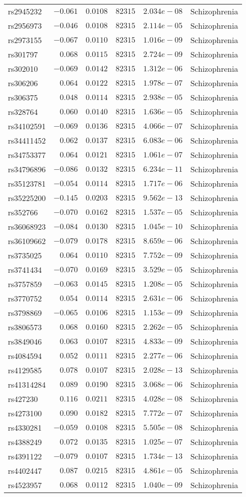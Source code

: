 \begin{tabular}{lrrrrl}
rs2945232&$-0.061$&$0.0108$&$ 82315$&$2.034e-08$&Schizophrenia\tabularnewline
rs2956973&$-0.046$&$0.0108$&$ 82315$&$2.114e-05$&Schizophrenia\tabularnewline
rs2973155&$-0.067$&$0.0110$&$ 82315$&$1.016e-09$&Schizophrenia\tabularnewline
rs301797&$ 0.068$&$0.0115$&$ 82315$&$2.724e-09$&Schizophrenia\tabularnewline
rs302010&$-0.069$&$0.0142$&$ 82315$&$1.312e-06$&Schizophrenia\tabularnewline
rs306206&$ 0.064$&$0.0122$&$ 82315$&$1.978e-07$&Schizophrenia\tabularnewline
rs306375&$ 0.048$&$0.0114$&$ 82315$&$2.938e-05$&Schizophrenia\tabularnewline
rs328764&$ 0.060$&$0.0140$&$ 82315$&$1.636e-05$&Schizophrenia\tabularnewline
rs34102591&$-0.069$&$0.0136$&$ 82315$&$4.066e-07$&Schizophrenia\tabularnewline
rs34411452&$ 0.062$&$0.0137$&$ 82315$&$6.083e-06$&Schizophrenia\tabularnewline
rs34753377&$ 0.064$&$0.0121$&$ 82315$&$1.061e-07$&Schizophrenia\tabularnewline
rs34796896&$-0.086$&$0.0132$&$ 82315$&$6.234e-11$&Schizophrenia\tabularnewline
rs35123781&$-0.054$&$0.0114$&$ 82315$&$1.717e-06$&Schizophrenia\tabularnewline
rs35225200&$-0.145$&$0.0203$&$ 82315$&$9.562e-13$&Schizophrenia\tabularnewline
rs352766&$-0.070$&$0.0162$&$ 82315$&$1.537e-05$&Schizophrenia\tabularnewline
rs36068923&$-0.084$&$0.0130$&$ 82315$&$1.045e-10$&Schizophrenia\tabularnewline
rs36109662&$-0.079$&$0.0178$&$ 82315$&$8.659e-06$&Schizophrenia\tabularnewline
rs3735025&$ 0.064$&$0.0110$&$ 82315$&$7.752e-09$&Schizophrenia\tabularnewline
rs3741434&$-0.070$&$0.0169$&$ 82315$&$3.529e-05$&Schizophrenia\tabularnewline
rs3757859&$-0.063$&$0.0145$&$ 82315$&$1.208e-05$&Schizophrenia\tabularnewline
rs3770752&$ 0.054$&$0.0114$&$ 82315$&$2.631e-06$&Schizophrenia\tabularnewline
rs3798869&$-0.065$&$0.0106$&$ 82315$&$1.153e-09$&Schizophrenia\tabularnewline
rs3806573&$ 0.068$&$0.0160$&$ 82315$&$2.262e-05$&Schizophrenia\tabularnewline
rs3849046&$ 0.063$&$0.0107$&$ 82315$&$4.833e-09$&Schizophrenia\tabularnewline
rs4084594&$ 0.052$&$0.0111$&$ 82315$&$2.277e-06$&Schizophrenia\tabularnewline
rs4129585&$ 0.078$&$0.0107$&$ 82315$&$2.028e-13$&Schizophrenia\tabularnewline
rs41314284&$ 0.089$&$0.0190$&$ 82315$&$3.068e-06$&Schizophrenia\tabularnewline
rs427230&$ 0.116$&$0.0211$&$ 82315$&$4.028e-08$&Schizophrenia\tabularnewline
rs4273100&$ 0.090$&$0.0182$&$ 82315$&$7.772e-07$&Schizophrenia\tabularnewline
rs4330281&$-0.059$&$0.0108$&$ 82315$&$5.505e-08$&Schizophrenia\tabularnewline
rs4388249&$ 0.072$&$0.0135$&$ 82315$&$1.025e-07$&Schizophrenia\tabularnewline
rs4391122&$-0.079$&$0.0107$&$ 82315$&$1.734e-13$&Schizophrenia\tabularnewline
rs4402447&$ 0.087$&$0.0215$&$ 82315$&$4.861e-05$&Schizophrenia\tabularnewline
rs4523957&$ 0.068$&$0.0112$&$ 82315$&$1.040e-09$&Schizophrenia\tabularnewline

\end{tabular}
